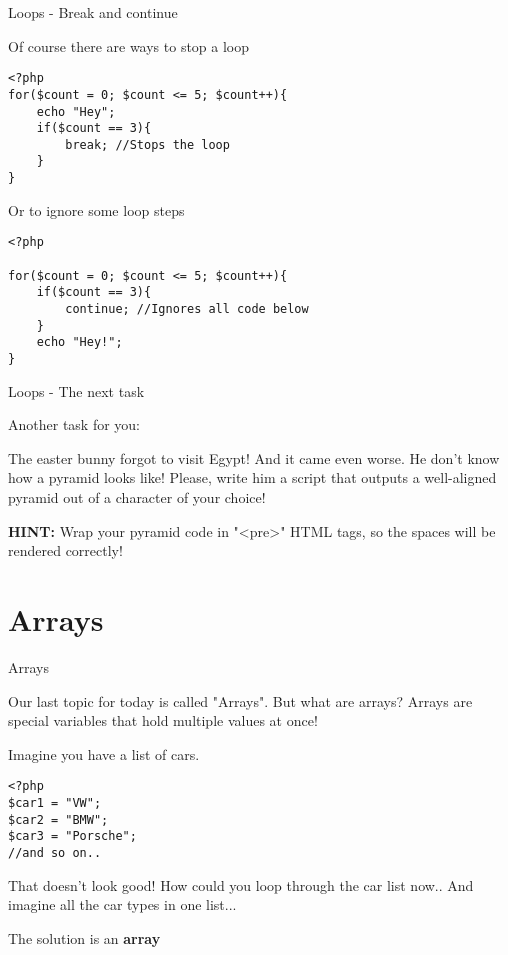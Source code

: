 \begin{frame}[fragile]{Loops - Break and continue}

Of course there are ways to stop a loop\pause

\begin{lstlisting}
<?php
for($count = 0; $count <= 5; $count++){
	echo "Hey";
	if($count == 3){
		break; //Stops the loop
	}
}
\end{lstlisting} \pause

Or to ignore some loop steps \pause

\begin{lstlisting}
<?php

for($count = 0; $count <= 5; $count++){
	if($count == 3){
		continue; //Ignores all code below
	}
	echo "Hey!";
}
\end{lstlisting} \pause

\end{frame}

\begin{frame}[fragile]{Loops - The next task}

Another task for you:

The easter bunny forgot to visit Egypt! And it came even worse. He don't know how a pyramid looks like! Please, write him a script that outputs a well-aligned pyramid out of a character of your choice! \pause

\textbf{HINT:} Wrap your pyramid code in "\textless{}pre\textgreater{}" HTML tags, so the spaces will be rendered correctly!

\end{frame}

\section{Arrays}

\begin{frame}[fragile]{Arrays}

Our last topic for today is called "Arrays". But what are arrays? \pause
Arrays are special variables that hold multiple values at once!

Imagine you have a list of cars.
\begin{lstlisting}
<?php
$car1 = "VW";
$car2 = "BMW";
$car3 = "Porsche";
//and so on..
\end{lstlisting} \pause

That doesn't look good! How could you loop through the car list now.. And imagine all the car types in one list... \pause

The solution is an \textbf{array}

\end{frame}


